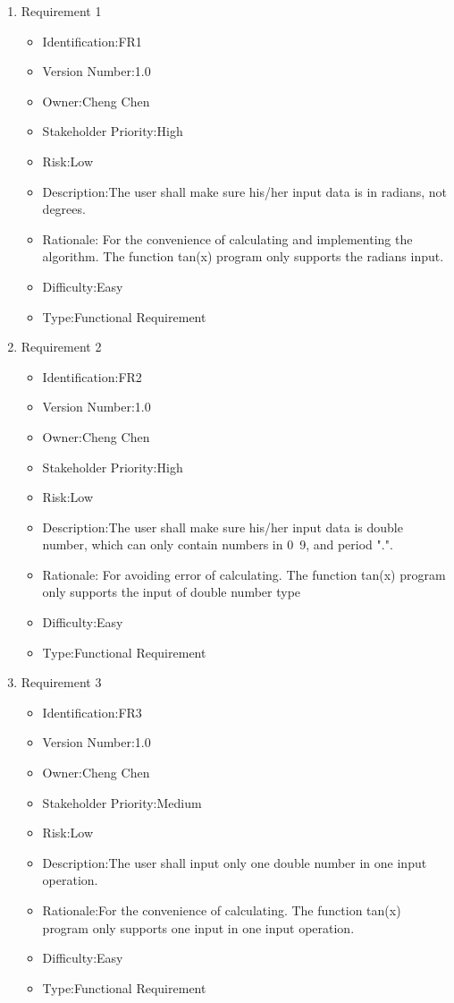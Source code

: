 \documentclass[10pt,a4paper,twoside]{article}
\begin{document}
\begin{enumerate}
\item 
Requirement 1
\begin{itemize}
\item Identification:FR1
\item Version Number:1.0
\item Owner:Cheng Chen
\item Stakeholder Priority:High
\item Risk:Low
\item Description:The user shall make sure his/her input data is in radians, not degrees.
\item Rationale: For the convenience of calculating and implementing the algorithm. The function tan(x) program only supports the radians input.
\item Difficulty:Easy
\item Type:Functional Requirement
\end{itemize} 

\item 
Requirement 2
\begin{itemize}
\item Identification:FR2
\item Version Number:1.0
\item Owner:Cheng Chen
\item Stakeholder Priority:High
\item Risk:Low
\item Description:The user shall make sure his/her input data is double number, which can only contain numbers in 0~9, and period ".".
\item Rationale: For avoiding error of calculating. The function tan(x) program only supports the input of double number type
\item Difficulty:Easy
\item Type:Functional Requirement
\end{itemize} 

\item 
Requirement 3
\begin{itemize}
\item Identification:FR3
\item Version Number:1.0
\item Owner:Cheng Chen
\item Stakeholder Priority:Medium
\item Risk:Low
\item Description:The user shall input only one double number in one input operation.
\item Rationale:For the convenience of calculating. The function tan(x) program only supports one input in one input operation.
\item Difficulty:Easy
\item Type:Functional Requirement
\end{itemize} 


\end{enumerate}
\end{document}

